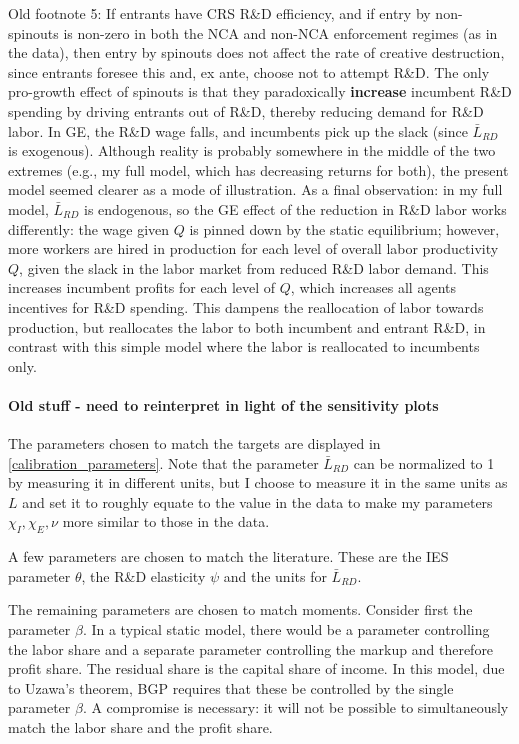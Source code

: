 \documentclass[12pt,english]{article}
\theoremstyle{remark}
\begin{document}
Old footnote 5: If entrants have CRS R\&D efficiency, and if entry by non-spinouts is non-zero in both the NCA and non-NCA enforcement regimes (as in the data), then entry by spinouts does not affect the rate of creative destruction, since entrants foresee this and, ex ante, choose not to attempt R\&D. The only pro-growth effect of spinouts is that they paradoxically \textbf{increase} incumbent R\&D spending by driving entrants out of R\&D, thereby reducing demand for R\&D labor. In GE, the R\&D wage falls, and incumbents pick up the slack (since $\bar{L}_{RD}$ is exogenous). Although reality is probably somewhere in the middle of the two extremes (e.g., my full model, which has decreasing returns for both), the present model seemed clearer as a mode of illustration. As a final observation: in my full model, $\bar{L}_{RD}$ is endogenous, so the GE effect of the reduction in R\&D labor works differently: the wage given $Q$ is pinned down by the static equilibrium; however, more workers are hired in production for each level of overall labor productivity $Q$, given the slack in the labor market from reduced R\&D labor demand. This increases incumbent profits for each level of $Q$, which increases all agents incentives for R\&D spending. This dampens the reallocation of labor towards production, but reallocates the labor to both incumbent and entrant R\&D, in contrast with this simple model where the labor is reallocated to incumbents only.



\paragraph{Old stuff - need to reinterpret in light of the sensitivity plots}

The parameters chosen to match the targets are displayed in \autoref{calibration_parameters}. Note that the parameter $\bar{L}_{RD}$ can be normalized to 1 by measuring it in different units, but I choose to measure it in the same units as $L$ and set it to roughly equate to the value in the data to make my parameters $\chi_I,\chi_E,\nu$ more similar to those in the data. 

A few parameters are chosen to match the literature. These are the IES parameter $\theta$, the R\&D elasticity $\psi$ and the units for $\bar{L}_{RD}$. 

The remaining parameters are chosen to match moments. Consider first the parameter $\beta$. In a typical static model, there would be a parameter controlling the labor share and a separate parameter controlling the markup and therefore profit share. The residual share is the capital share of income. In this model, due to Uzawa's theorem, BGP requires that these be controlled by the single parameter $\beta$. A compromise is necessary: it will not be possible to simultaneously match the labor share and the profit share. 
\end{document}
